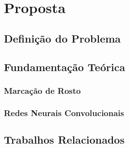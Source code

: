 \chapter{Proposta}

\section{Definição do Problema}

\section{Fundamentação Teórica}

\subsection{Marcação de Rosto}

\subsection{Redes Neurais Convolucionais}

\section{Trabalhos Relacionados}
